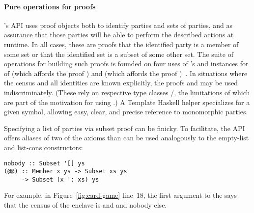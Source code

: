 \paragraph{Pure operations for proofs}
\MultiChor's API uses proof objects both to identify parties and sets of parties,
and as assurance that those parties will be able to perform the described actions at runtime.
In all cases, these are proofs that the identified party is a member of some set
or that the identified set is a subset of some other set.
The suite of operations for building such proofs is founded on four uses of
's 
and instances for  of 
(which affords the proof )
and  (which affords the proof )~\cite{gdp_hackage}.
In situations where the census and all identities are known explicitly,
the proofs  and  may be used indiscriminately.
(These rely on respective type classes /,
the limitations of which are part of the motivation for using
.)
A Template Haskell helper  specializes  for a given 
symbol, allowing easy, clear, and precise reference to monomorphic parties.

Specifying a list of parties via subset proof can be finicky.
To facilitate, the API offers aliases of two of the axioms
than can be used analogously to the empty-list and list-cons constructors:
%
\begin{verbatim}
nobody :: Subset '[] ys
(@@) :: Member x ys -> Subset xs ys
     -> Subset (x ': xs) ys
\end{verbatim}
%
For example, in Figure~\ref{fig:card-game} line~18, the first argument to the
says that the census of the enclave is
 and  and nobody else.

